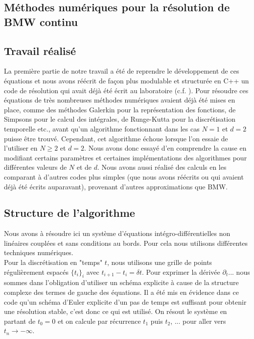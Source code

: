\documentclass[10.5pt]{article}
\begin{document}
\begin{multicols*}{2}
\vspace*{11pt}

\section{Méthodes numériques pour la résolution de BMW continu}

\label{sec:NumContinu}

\subsection{Travail réalisé}


La première partie de notre travail a été de reprendre le développement de ces équations et nous avons réécrit de façon plus modulable et structurée en C++ un code de résolution qui avait déjà été écrit au laboratoire (c.f. ). Pour résoudre ces équations de très nombreuses méthodes numériques avaient déjà été mises en place, comme des méthodes Galerkin \cite{shen1994efficient, LeonardThesis} pour la représentation des fonctions, de Simpsons pour le calcul des intégrales, de Runge-Kutta pour la discrétisation temporelle etc., avant qu'un algorithme fonctionnant dans les cas $N=1$ et $d=2$ puisse être trouvé. Cependant, cet algorithme échoue lorsque l'on essaie de l'utiliser en $N \ge 2$ et $d=2$. Nous avons donc essayé d'en comprendre la cause en modifiant certains paramètres et certaines implémentations des algorithmes pour différentes valeurs de $N$ et de $d$. Nous avons aussi réalisé des calculs en les comparant à d'autres codes plus simples (que nous avons réécrits ou qui avaient déjà été écrits auparavant), provenant d'autres approximations que BMW. 


\subsection{Structure de l'algorithme}

Nous avons à résoudre ici un système d'équations intégro-différentielles non linéaires couplées et sans conditions au bords. Pour cela nous utilisons différentes techniques numériques. \\

Pour la discrétisation en "temps" $t$, nous utilisons une grille de points régulièrement espacés $\{t_i\}_i$ avec $t_{i+1} - t_i = \delta t$. Pour exprimer la dérivée $\partial_t ...$ nous sommes dans l'obligation d'utiliser un schéma explicite à cause de la structure complexe des termes de gauche des équations. Il a été mis en évidence dans ce code qu'un schéma d'Euler explicite d'un pas de temps est suffisant pour obtenir une résolution stable, c'est donc ce qui est utilisé. On résout le système en partant de $t_0 = 0$ et on calcule par récurrence $t_1$ puis $t_2$, ... pour aller vers $t_n \to - \infty$.\\


\end{multicols*}
\end{document}
